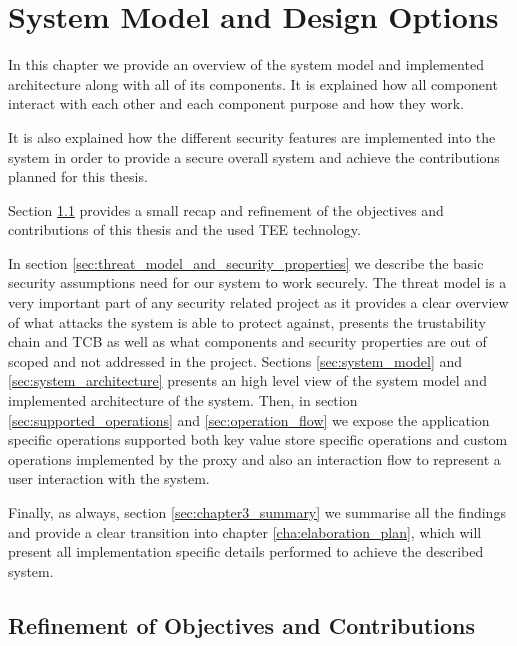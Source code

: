 
\chapter{System Model and Design Options}
\label{cha:system_model_and_design_options}

In this chapter we provide an overview of the system model and implemented architecture along with all of its components. It is explained how all component interact with each other and each component purpose and how they work.

It is also explained how the different security features are implemented into the system in order to provide a secure overall system and achieve the contributions planned for this thesis.

Section \ref{sec:refinement_of_objectives_and_contributions} provides a small recap and refinement of the objectives and contributions of this thesis and the used \gls{TEE} technology.

In section \ref{sec:threat_model_and_security_properties} we describe the basic security assumptions need for our system to work securely. The threat model is a very important part of any security related project as it provides a clear overview of what attacks the system is able to protect against, presents the trustability chain and \gls{TCB} as well as what components and  security properties are out of scoped and not addressed in the project.
Sections \ref{sec:system_model} and \ref{sec:system_architecture} presents an high level view of the system model and implemented architecture of the system. Then, in section \ref{sec:supported_operations} and \ref{sec:operation_flow} we expose the application specific operations supported both key value store specific operations and custom operations implemented by the proxy and also an interaction flow to represent a user interaction with the system.

Finally, as always, section \ref{sec:chapter3_summary} we summarise all the findings and provide a clear transition into chapter \ref{cha:elaboration_plan}, which will present all implementation specific details performed to achieve the described system.

\section{Refinement of Objectives and Contributions} %
\label{sec:refinement_of_objectives_and_contributions}

